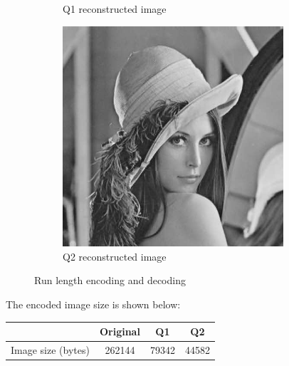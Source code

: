 \documentclass{homework}
\begin{document}
\begin{figure}[H]
\begin{subfigure}{0.32\textwidth}
        \caption{Q1 reconstructed image}
    \end{subfigure}
    \begin{subfigure}{0.32\textwidth}
        \centering
        \includegraphics[width=0.9\textwidth]{reconstructed_image_Q2.png}
        \caption{Q2 reconstructed image}
    \end{subfigure}
    \caption{Run length encoding and decoding}
\end{figure}

The encoded image size is shown below:

\begin{table}[H]
    \centering
    \begin{tabular}{|c|c|c|c|}
        \hline
        & Original & Q1 & Q2 \\
        \hline
        Image size (bytes) & 262144 & 79342 & 44582 \\
        \hline
    \end{tabular}
\end{table}

\end{document}
